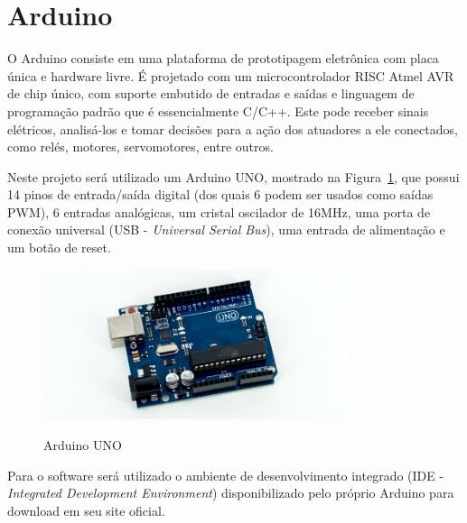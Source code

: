 
\section{Arduino}
\label{sec:Arduino}

O Arduino consiste em uma plataforma de prototipagem eletrônica com placa única e hardware livre. É projetado com um microcontrolador RISC Atmel AVR de chip único, com suporte embutido de entradas e saídas e linguagem de programação padrão que é essencialmente C/C++. Este pode receber sinais elétricos, analisá-los e tomar decisões para a ação dos atuadores a ele conectados, como relés, motores, servomotores, entre outros.

Neste projeto será utilizado um Arduino UNO, mostrado na Figura~\ref{fig:arduino-uno}, que possui 14 pinos de entrada/saída digital (dos quais 6 podem ser usados como saídas PWM), 6 entradas analógicas, um cristal oscilador de 16MHz, uma porta de conexão universal (USB - \textit{Universal Serial Bus}), uma entrada de alimentação e um botão de reset.

\begin{figure}[!hbtp]
  \centering
   \caption{Arduino UNO}
    \includegraphics[width = 0.8\textwidth]{Caps/Figs/mat-met/arduino.png}
   \label{fig:arduino-uno}
\end{figure}

Para o software será utilizado o ambiente de desenvolvimento integrado (IDE - \textit{Integrated Development Environment}) disponibilizado pelo próprio Arduino para download em seu site oficial.


